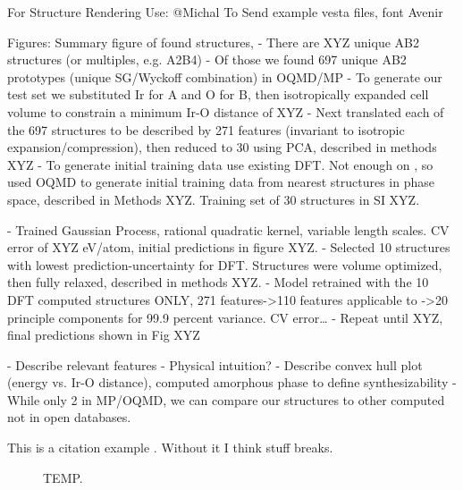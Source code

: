 For Structure Rendering Use:
@Michal To Send example vesta files, font Avenir


Figures: Summary figure of found structures,
- There are XYZ unique AB2 structures (or multiples, e.g. A2B4)
- Of those we found 697 unique AB2 prototypes (unique SG/Wyckoff combination) in OQMD/MP
- To generate our test set we substituted Ir for A and O for B, then isotropically expanded cell volume to constrain a minimum Ir-O distance of XYZ
- Next translated each of the 697 structures to be described by 271 features (invariant to isotropic expansion/compression), then reduced to 30 using PCA, described in methods XYZ
- To generate initial training data use existing DFT. Not enough on , so used OQMD to generate initial training data from nearest structures in phase space, described in Methods XYZ. Training set of 30 structures in SI XYZ.

- Trained Gaussian Process, rational quadratic kernel, variable length scales.
CV error of XYZ eV/atom, initial predictions in figure XYZ.
- Selected 10 structures with lowest prediction-uncertainty for DFT.
Structures were volume optimized, then fully relaxed, described in methods XYZ.
- Model retrained with the 10 DFT computed structures ONLY, 271 features->110 features applicable to ->20 principle components for 99.9 percent variance.
CV error…
- Repeat until XYZ, final predictions shown in Fig XYZ


- Describe relevant features
  - Physical intuition?
- Describe convex hull plot (energy vs. Ir-O distance), computed amorphous phase to define synthesizability
- While only 2  in MP/OQMD, we can compare our structures to other computed  not in open databases.

This is a citation example \cite{dummy9999}.
Without it I think stuff breaks.


\begin{figure}
\centering
{}
\caption{\label{fig:convergence_plot_iro2_0}
  TEMP.
  }
\end{figure}
